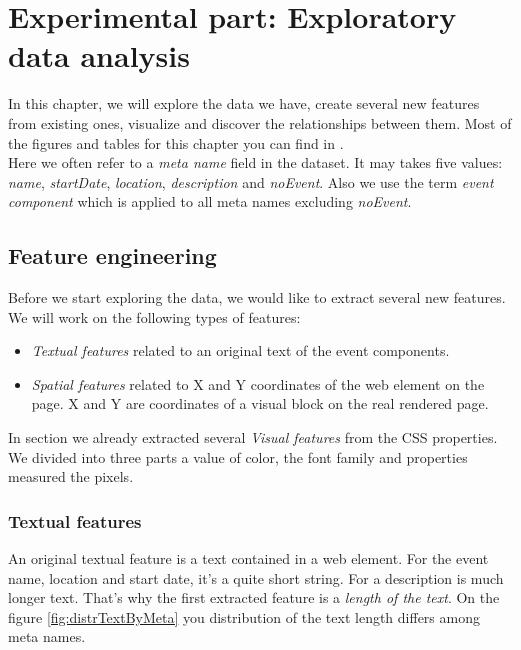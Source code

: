 \chapter{Experimental part: Exploratory data analysis}
\label{chap:dataexplore}
In this chapter, we will explore the data we have, create several new features from existing ones, visualize and discover the relationships between them. Most of the figures and tables for this chapter you can find in .\\

Here we often refer to a \textit{meta name} field in the dataset. It may takes five values: \textit{name}, \textit{startDate}, \textit{location}, \textit{description} and \textit{noEvent}. Also we use the term \textit{event component} which is applied to all meta names excluding \textit{noEvent}.


\section{Feature engineering}
Before we start exploring the data, we would like to extract several new features. We will work on the following types of features: 

\begin{itemize}
\item \textit{Textual features} related to an original text of the event components.
\item \textit{Spatial features} related to X and Y coordinates of the web element on the page. X and Y are coordinates of a visual block on the real rendered page. 
\end{itemize}

In section  we already extracted several \textit{Visual features} from the CSS properties. We divided into three parts a value of color, the font family and properties measured the pixels. 

\subsection{Textual features}

An original textual feature is a text contained in a web element. For the event name, location and start date, it's a quite short string. For a description is much longer text. That's why the first extracted feature is a \textit{length of the text}. On the figure \ref{fig:distrTextByMeta} you distribution of the text length differs among meta names. \\

